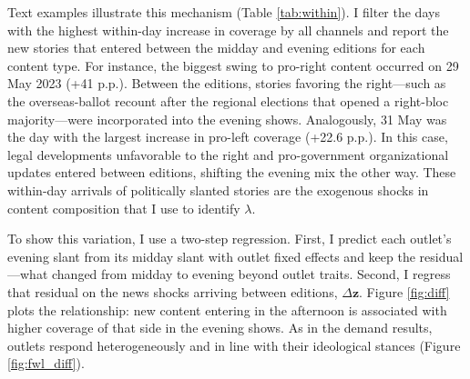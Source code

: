 \documentclass[12pt]{article}
\begin{document}


Text examples illustrate this mechanism (Table \ref{tab:within}). I filter the days with the highest within-day increase in coverage by all channels and report the new stories that entered between the midday and evening editions for each content type. For instance, the biggest swing to pro-right content occurred on 29 May 2023 (+41 p.p.). Between the editions, stories favoring the right—such as the overseas-ballot recount after the regional elections that opened a right-bloc majority—were incorporated into the evening shows. Analogously, 31 May was the day with the largest increase in pro-left coverage (+22.6 p.p.). In this case, legal developments unfavorable to the right and pro-government organizational updates entered between editions, shifting the evening mix the other way. These within-day arrivals of politically slanted stories are the exogenous shocks in content composition that I use to identify $\lambda$.



To show this variation, I use a two-step regression. First, I predict each outlet’s evening slant from its midday slant with outlet fixed effects and keep the residual—what changed from midday to evening beyond outlet traits. Second, I regress that residual on the news shocks arriving between editions, $\Delta \bm{z}$. Figure \ref{fig:diff} plots the relationship: new content entering in the afternoon is associated with higher coverage of that side in the evening shows. As in the demand results, outlets respond heterogeneously and in line with their ideological stances (Figure \ref{fig:fwl_diff}).

\end{document}
